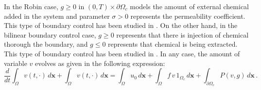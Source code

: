 \documentclass[11pt]{article}
\def \x{\boldsymbol{x}}
\numberwithin{theorem}{section}
\begin{document}
In the Robin case, $g\ge0$ in $(0,T)\times\partial\Omega_c $ models the amount of external chemical added in the system and parameter $\sigma>0$ represents the permeability coefficient. This type of boundary control has been studied in \cite{LebiedzMaurer}. On the other hand, in the bilinear boundary control case, $g\ge0$ represents that there is injection of chemical thorough the boundary, and $g\le0$ represents that chemical is being extracted.  This type of boundary control has been studied in 
\cite{LebiedzMaurer}. In any case, the amount of variable $v$ evolves as given in the following expression:
\begin{equation} \label{total-v}
\frac{d}{dt}  \int_\Omega v(t,\cdot) \, d\x
+ \int_\Omega v(t,\cdot) \, d\x
= \int_\Omega u_0  \, d\x
+ \int_\Omega f \, v \, 1_{\Omega_c}  \, d\x
+ \int_{\partial\Omega_c} P(v,g) \, d\x \,.
\end{equation} 







 
\end{document}

